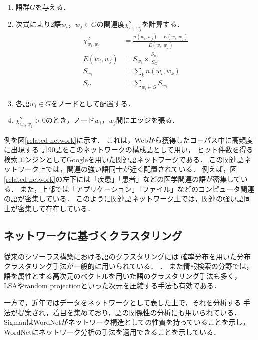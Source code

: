 \documentclass[japanese]{jnlp_1.3a}
\begin{document}
\begin{enumerate}
\item 語群$G$を与える．
\item 次式により2語$w_i， w_j \in G$の関連度$\chi^2_{w_i, w_j}$を計算する．
\begin{align}
\label{chi2}
 \chi^2_{w_i,w_j} & = \frac{n(w_i,w_j) - E(w_i,w_j)}{E(w_i,w_j)}   \nonumber \\
 E(w_i,w_j) & = S_{w_i} \times \frac{S_{w_j}}{S_G} \\
 S_{w_i} & = \sum_{k} n(w_i,w_k) \nonumber \\
 S_G & = \sum_{w_i \in G} S_{w_i} \nonumber 
\end{align}
\item 各語$w_i \in G$をノードとして配置する．
\item $\chi^2_{w_i,w_j} > 0$のとき，ノード$w_i$，$w_j$間にエッジを張る．
\end{enumerate}


例を図\ref{related-network}に示す．
これは，Webから獲得したコーパス中に高頻度に出現する
計90語をこのネットワークの構成語として用い，
ヒット件数を得る検索エンジンとしてGoogleを用いた関連語ネットワークである．
この関連語ネットワーク上では，関連の強い語同士が近く配置されている．
例えば，図\ref{related-network}の左下には「疾患」「患者」などの医学関連の語が密集している．
また，上部では「アプリケーション」「ファイル」などのコンピュータ関連の語が密集している．
このように関連語ネットワーク上では，関連の強い語同士が密集して存在している．


\subsection{ネットワークに基づくクラスタリング}


従来のシソーラス構築における語のクラスタリングには
確率分布を用いた分布クラスタリング手法が一般的に用いられている．
\cite{Pereira93,Dhillon02}．
また情報検索の分野では，語を属性とする高次元のベクトルを用いた語のクラスタリング手法も多く，
LSAやrandom projectionといった次元を圧縮する手法も有効である\cite{Deerwester90,papadim98}．

一方で，近年ではデータをネットワークとして表した上で，それを分析する
手法が提案され，着目を集めており，語の関係性の分析にも用いられている\cite{Widdows02,motter02,Palla05}．
SigmanはWordNetがネットワーク構造としての性質を持っていることを示し，
WordNetにネットワーク分析の手法を適用できることを示している\cite{sigman02}．
\end{document}
